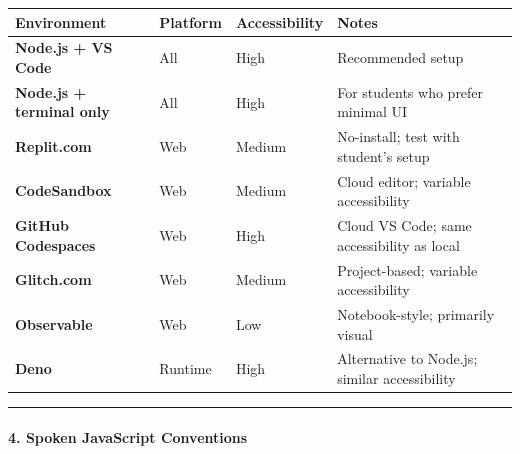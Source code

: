 \documentclass[
  justified,
  openright,
]{tufte-book}
\let\subsection\paragraph
\let\paragraph\paragraph
\let\subsection\paragraph
\let\paragraph\paragraph
\begin{document}
\begin{fullwidth}{\def\LTcaptype{none} %
\begin{longtable}[]{@{}
  >{\raggedright\arraybackslash}p{}
  >{\raggedright\arraybackslash}p{}
  >{\raggedright\arraybackslash}p{}
  >{\raggedright\arraybackslash}p{}@{}}
\toprule\noalign{}
\begin{minipage}[b]{\linewidth}\raggedright
Environment
\end{minipage} & \begin{minipage}[b]{\linewidth}\raggedright
Platform
\end{minipage} & \begin{minipage}[b]{\linewidth}\raggedright
Accessibility
\end{minipage} & \begin{minipage}[b]{\linewidth}\raggedright
Notes
\end{minipage} \\
\midrule\noalign{}
\endhead
\bottomrule\noalign{}
\endlastfoot
\textbf{Node.js + VS Code} & All & High & Recommended setup \\
\textbf{Node.js + terminal only} & All & High & For students who prefer
minimal UI \\
\textbf{Replit.com} & Web & Medium & No-install; test with student's
setup \\
\textbf{CodeSandbox} & Web & Medium & Cloud editor; variable
accessibility \\
\textbf{GitHub Codespaces} & Web & High & Cloud VS Code; same
accessibility as local \\
\textbf{Glitch.com} & Web & Medium & Project-based; variable
accessibility \\
\textbf{Observable} & Web & Low & Notebook-style; primarily visual \\
\textbf{Deno} & Runtime & High & Alternative to Node.js; similar
accessibility \\
\end{longtable}
}
\end{fullwidth}

\begin{center}\rule{0.5\linewidth}{0.5pt}\end{center}

\subsection{4. Spoken JavaScript
Conventions}\label{spoken-javascript-conventions}
\end{document}
